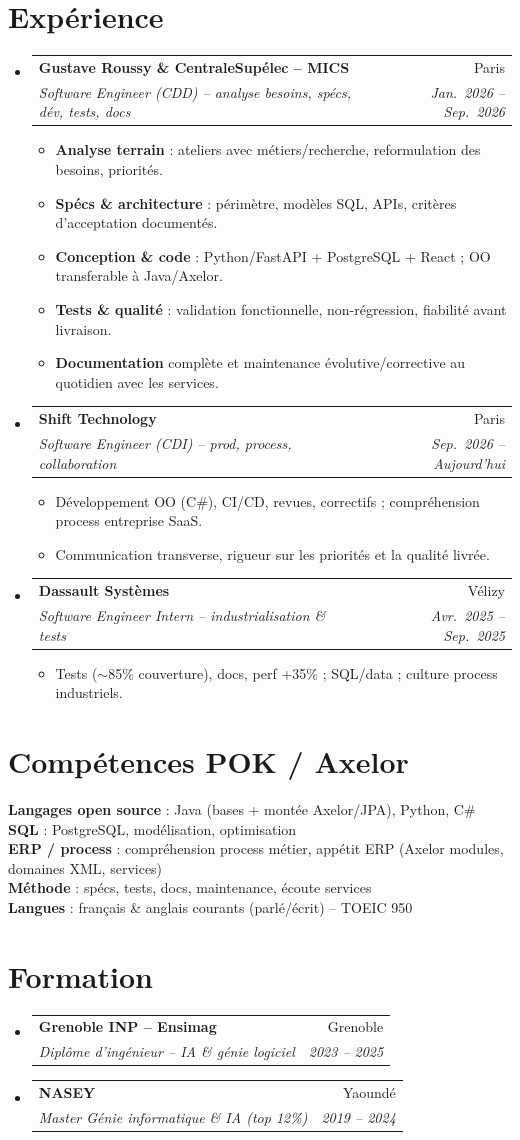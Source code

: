 \documentclass[a4paper,10.5pt]{article}
\makeatletter
\newcommand{\resumeItem}[1]{\item\small{#1}}
\newcommand{\resumeSubheading}[4]{\vspace{3pt}\item\begin{tabular*}{0.97\textwidth}[t]{l@{\extracolsep{\fill}}r}\textbf{#1}&{#2}\\\textit{\small #3}&\textit{\small #4}\\\end{tabular*}\vspace{1pt}}
\newcommand{\resumeSubHeadingListStart}{\begin{itemize}[leftmargin=0.08in,label={}]}
\newcommand{\resumeSubHeadingListEnd}{\end{itemize}}
\makeatother
\begin{document}
\section{Exp\'erience}
\resumeSubHeadingListStart
  \resumeSubheading
    {Gustave Roussy \& CentraleSup\'elec -- MICS}{Paris}
    {Software Engineer (CDD) -- analyse besoins, sp\'ecs, d\'ev, tests, docs}{Jan.~2026 -- Sep.~2026}
    \begin{itemize}
      \resumeItem{\textbf{Analyse terrain} : ateliers avec m\'etiers/recherche, reformulation des besoins, priorit\'es.}
      \resumeItem{\textbf{Sp\'ecs \& architecture} : p\'erim\`etre, mod\`eles SQL, APIs, crit\`eres d'acceptation document\'es.}
      \resumeItem{\textbf{Conception \& code} : Python/FastAPI + PostgreSQL + React ; OO transferable \`a Java/Axelor.}
      \resumeItem{\textbf{Tests \& qualit\'e} : validation fonctionnelle, non-r\'egression, fiabilit\'e avant livraison.}
      \resumeItem{\textbf{Documentation} compl\`ete et maintenance \'evolutive/corrective au quotidien avec les services.}
    \end{itemize}
  \resumeSubheading
    {Shift Technology}{Paris}
    {Software Engineer (CDI) -- prod, process, collaboration}{Sep.~2026 -- Aujourd'hui}
    \begin{itemize}
      \resumeItem{D\'eveloppement OO (C\#), CI/CD, revues, correctifs ; compr\'ehension process entreprise SaaS.}
      \resumeItem{Communication transverse, rigueur sur les priorit\'es et la qualit\'e livr\'ee.}
    \end{itemize}
  \resumeSubheading
    {Dassault Syst\`emes}{V\'elizy}
    {Software Engineer Intern -- industrialisation \& tests}{Avr.~2025 -- Sep.~2025}
    \begin{itemize}
      \resumeItem{Tests ($\sim$85\% couverture), docs, perf +35\% ; SQL/data ; culture process industriels.}
    \end{itemize}
\resumeSubHeadingListEnd

\section{Comp\'etences POK / Axelor}
\begin{itemize}[leftmargin=0.08in,label={}]\small{\item{
\textbf{Langages open source} : Java (bases + mont\'ee Axelor/JPA), Python, C\# \\
\textbf{SQL} : PostgreSQL, mod\'elisation, optimisation \\
\textbf{ERP / process} : compr\'ehension process m\'etier, app\'etit ERP (Axelor modules, domaines XML, services) \\
\textbf{M\'ethode} : sp\'ecs, tests, docs, maintenance, \'ecoute services \\
\textbf{Langues} : fran\c{c}ais \& anglais courants (parl\'e/\'ecrit) -- TOEIC 950
}}\end{itemize}

\section{Formation}
\resumeSubHeadingListStart
  \resumeSubheading{Grenoble INP -- Ensimag}{Grenoble}{Dipl\^ome d'ing\'enieur -- IA \& g\'enie logiciel}{2023 -- 2025}
  \resumeSubheading{NASEY}{Yaound\'e}{Master G\'enie informatique \& IA (top 12\%)}{2019 -- 2024}
\resumeSubHeadingListEnd
\end{document}
